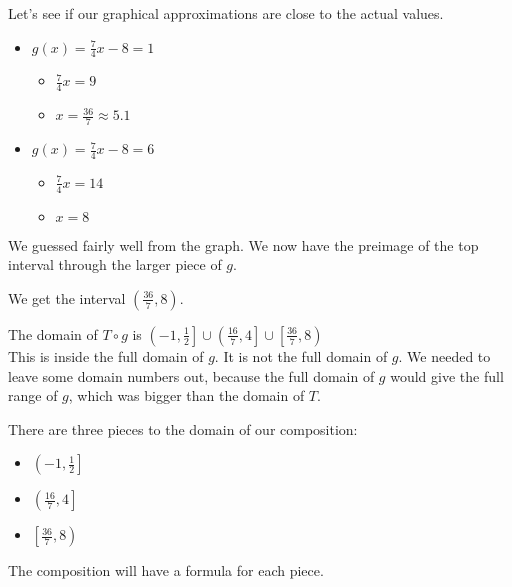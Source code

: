 \documentclass{ximera}
\begin{document}
Let's see if our graphical approximations are close to the actual values.

\begin{itemize}
\item $g(x) = \frac{7}{4}x -8 = 1$
\begin{itemize}
\item $\frac{7}{4}x = 9$
\item $x = \frac{36}{7} \approx 5.1$
\end{itemize}
\end{itemize}

\begin{itemize}
\item $g(x) = \frac{7}{4}x -8 = 6$
\begin{itemize}
\item $\frac{7}{4}x = 14$
\item $x = 8$
\end{itemize}
\end{itemize}








We guessed fairly well from the graph.  We now have the preimage of the top interval through the larger piece of $g$.  


We get the interval $\left( \frac{36}{7}, 8 \right)$.






The domain of $T \circ g$ is $\left( -1, \frac{1}{2} \right] \cup \left( \frac{16}{7}, 4 \right] \cup \left[ \frac{36}{7}, 8 \right)$ \\


This is inside the full domain of $g$. It is not the full domain of $g$.  We needed to leave some domain numbers out, because the full domain of $g$ would give the full range of $g$, which was bigger than the domain of $T$.



There are three pieces to the domain of our composition: 


\begin{itemize}
  \item $\left( -1, \frac{1}{2} \right]$
  \item $\left( \frac{16}{7}, 4 \right]$
  \item $\left[ \frac{36}{7}, 8 \right)$
\end{itemize}



The composition will have a formula for each piece.
\end{document}
